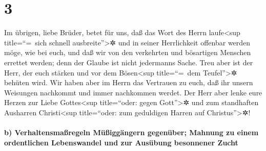 \hypertarget{section-2}{%
\section{3}\label{section-2}}

 Im übrigen, liebe Brüder, betet für uns, daß das Wort des
Herrn laufe\textless sup title=``=~sich schnell ausbreite''\textgreater✲
und in seiner Herrlichkeit offenbar werden möge, wie bei euch,
 und daß wir von den verkehrten und bösartigen Menschen
errettet werden; denn der Glaube ist nicht jedermanns Sache.
 Treu aber ist der Herr, der euch stärken und vor dem
Bösen\textless sup title=``=~dem Teufel''\textgreater✲ behüten wird.
 Wir haben aber im Herrn das Vertrauen zu euch, daß ihr
unsern Weisungen nachkommt und immer nachkommen werdet. 
Der Herr aber lenke eure Herzen zur Liebe Gottes\textless sup
title=``oder: gegen Gott''\textgreater✲ und zum standhaften Ausharren
Christi\textless sup title=``oder: zum geduldigen Harren auf
Christus''\textgreater✲!

\hypertarget{b-verhaltensmauxdfregeln-muxfcuxdfigguxe4ngern-gegenuxfcber-mahnung-zu-einem-ordentlichen-lebenswandel-und-zur-ausuxfcbung-besonnener-zucht}{%
\paragraph{b) Verhaltensmaßregeln Müßiggängern gegenüber; Mahnung zu
einem ordentlichen Lebenswandel und zur Ausübung besonnener
Zucht}\label{b-verhaltensmauxdfregeln-muxfcuxdfigguxe4ngern-gegenuxfcber-mahnung-zu-einem-ordentlichen-lebenswandel-und-zur-ausuxfcbung-besonnener-zucht}}

